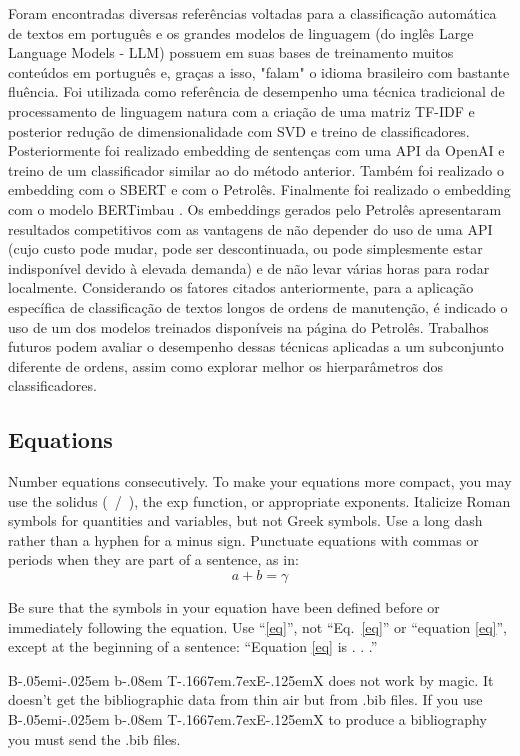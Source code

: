 \documentclass[conference]{IEEEtran}
\def\BibTeX{{\rm B\kern-.05em{\sc i\kern-.025em b}\kern-.08em
    T\kern-.1667em\lower.7ex\hbox{E}\kern-.125emX}}
\begin{document}
  Foram encontradas diversas referências voltadas para a classificação automática de textos em português e os grandes modelos de linguagem (do inglês Large Language Models - LLM) possuem em suas bases de treinamento muitos conteúdos em português e, graças a isso, "falam" o idioma brasileiro com bastante fluência.
  Foi utilizada como referência de desempenho uma técnica tradicional de processamento de linguagem natura com a criação de uma matriz TF-IDF e posterior redução de dimensionalidade com SVD e treino de classificadores. Posteriormente foi realizado embedding de sentenças com uma API da OpenAI e treino de um classificador similar ao do método anterior. Também foi realizado o embedding com o SBERT e com o Petrolês. Finalmente foi realizado o embedding com o modelo BERTimbau \cite{souza2020bertimbau}. Os embeddings gerados pelo Petrolês apresentaram resultados competitivos com as vantagens de não depender do uso de uma API (cujo custo pode mudar, pode ser descontinuada, ou pode simplesmente estar indisponível devido à elevada demanda) e de não levar várias horas para rodar localmente.
  Considerando os fatores citados anteriormente, para a aplicação específica de classificação de textos longos de ordens de manutenção, é indicado o uso de um dos modelos treinados disponíveis na página do Petrolês.
  Trabalhos futuros podem avaliar o desempenho dessas técnicas aplicadas a um subconjunto diferente de ordens, assim como explorar melhor os hierparâmetros dos classificadores.

  
\subsection{Equations}
Number equations consecutively. To make your 
equations more compact, you may use the solidus (~/~), the exp function, or 
appropriate exponents. Italicize Roman symbols for quantities and variables, 
but not Greek symbols. Use a long dash rather than a hyphen for a minus 
sign. Punctuate equations with commas or periods when they are part of a 
sentence, as in:
\begin{equation}
a+b=\gamma\label{eq}
\end{equation}

Be sure that the 
symbols in your equation have been defined before or immediately following 
the equation. Use ``\eqref{eq}'', not ``Eq.~\eqref{eq}'' or ``equation \eqref{eq}'', except at 
the beginning of a sentence: ``Equation \eqref{eq} is . . .''


{\BibTeX} does not work by magic. It doesn't get the bibliographic
data from thin air but from .bib files. If you use {\BibTeX} to produce a
bibliography you must send the .bib files. 
\end{document}
